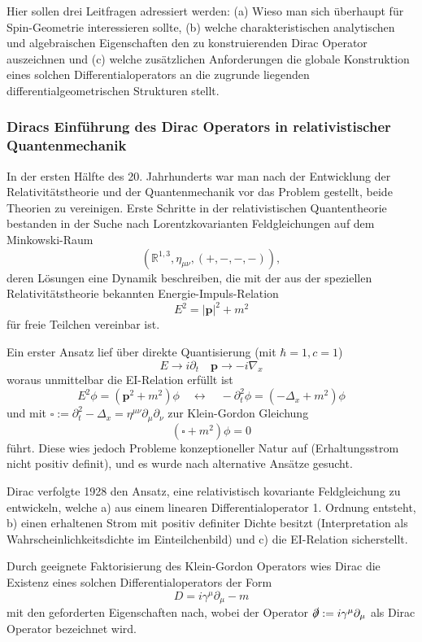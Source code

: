 \documentclass[10pt, letterpaper]{article}
\begin{document}
Hier sollen drei Leitfragen adressiert werden: (a) Wieso man sich überhaupt für Spin-Geometrie interessieren sollte, (b) welche charakteristischen analytischen und algebraischen Eigenschaften den zu konstruierenden Dirac Operator auszeichnen und (c) welche zusätzlichen Anforderungen die globale Konstruktion eines solchen Differentialoperators an die zugrunde liegenden differentialgeometrischen Strukturen stellt. 



\subsubsection{Diracs Einführung des Dirac Operators in relativistischer Quantenmechanik}

In der ersten Hälfte des 20. Jahrhunderts war man nach der Entwicklung der Relativitätstheorie und der Quantenmechanik vor das Problem gestellt, beide Theorien zu vereinigen. Erste Schritte in der relativistischen Quantentheorie bestanden in der Suche nach Lorentzkovarianten Feldgleichungen auf dem Minkowski-Raum
$$\left(\mathbb{R}^{1,3}, \eta_{\mu \nu},(+,-,-,-)\right),$$
deren Lösungen eine Dynamik beschreiben, die mit der aus der speziellen Relativitätstheorie bekannten Energie-Impuls-Relation
$$E^2=|\mathbf{p}|^2+m^2$$
für freie Teilchen vereinbar ist.

Ein erster Ansatz lief über direkte Quantisierung (mit $\hbar=1, c=1$)
$$E\to i\partial_t \quad \mathbf{p}\to -i\nabla_x$$
woraus unmittelbar die EI-Relation erfüllt ist 
$$E^2\phi=(\mathbf{p}^2+m^2)\phi \quad \longleftrightarrow \quad -\partial_t^2\phi=(-\Delta_x+m^2)\phi$$
und mit $\square:=\partial_t^2-\Delta_x=\eta^{\mu\nu}\partial_\mu\partial_\nu$ zur Klein-Gordon Gleichung
$$(\square +m^2)\phi=0$$
führt. Diese wies jedoch Probleme konzeptioneller Natur auf (Erhaltungsstrom nicht positiv definit), und es wurde nach alternative Ansätze gesucht. 

Dirac verfolgte 1928 den Ansatz, eine relativistisch kovariante Feldgleichung zu entwickeln, welche a) aus einem linearen Differentialoperator 1. Ordnung entsteht, b) einen erhaltenen Strom mit positiv definiter Dichte besitzt (Interpretation als Wahrscheinlichkeitsdichte im Einteilchenbild) und c) die EI-Relation sicherstellt. 

Durch geeignete Faktorisierung des Klein-Gordon Operators wies Dirac die Existenz eines solchen Differentialoperators der Form
$$D=i\gamma^\mu\partial_\mu -m$$
mit den geforderten Eigenschaften nach, wobei der Operator $\slashed{\partial}:=i\gamma^\mu\partial_\mu$ als Dirac Operator bezeichnet wird. 
\end{document}

